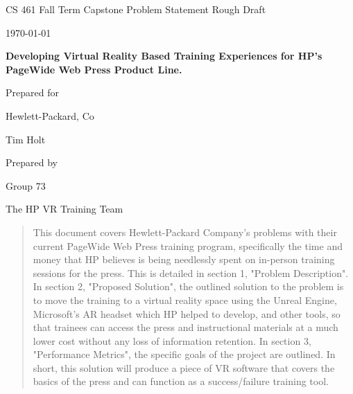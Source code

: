 \documentclass[onecolumn, draftclsnofoot,10pt, compsoc]{IEEEtran}
\def \CapstoneTeamName{		The HP VR Training Team }
\def \CapstoneTeamNumber{		73}
\def \GroupMemberOne{			Stewart Rodger}
\def \CapstoneProjectName{		Developing Virtual Reality Based Training Experiences for HP's PageWide Web Press Product Line. }
\def \CapstoneSponsorCompany{	Hewlett-Packard, Co}
\def \CapstoneSponsorPerson{		Tim Holt}
\def \DocType{		Problem Statement
				}
\newcommand{\NameSigPair}[1]{\par
\makebox[2.75in][r]{#1} \hfil 	\makebox[3.25in]{\makebox[2.25in]{\hrulefill} \hfill		\makebox[.75in]{\hrulefill}}
\par\vspace{-12pt} \textit{\tiny\noindent
\makebox[2.75in]{} \hfil		\makebox[3.25in]{\makebox[2.25in][r]{Signature} \hfill	\makebox[.75in][r]{Date}}}}
\renewcommand{\NameSigPair}[1]{#1}
\begin{document}
\begin{titlepage}
    \begin{singlespace}
        \hfill 
        \par\vspace{.2in}
        \centering
        \scshape{
            \huge CS 461 Fall Term Capstone \DocType Rough Draft \par
            {\large\today}\par
            \vspace{.5in}
            \textbf{\Huge\CapstoneProjectName}\par
            \vfill
            {\large Prepared for}\par
            \Huge \CapstoneSponsorCompany\par
            \vspace{5pt}
            {\Large\NameSigPair{\CapstoneSponsorPerson}\par}
            {\large Prepared by }\par
            Group\CapstoneTeamNumber\par
            \CapstoneTeamName\par 
            \vspace{5pt}
            {\Large
            }
            \vspace{20pt}
        }
        \begin{abstract}
        	This document covers Hewlett-Packard Company's problems with their current PageWide Web Press training program, specifically the time and money that HP believes is being needlessly spent on in-person training sessions for the press. This is detailed in section 1, "Problem Description". In section 2, "Proposed Solution", the outlined solution to the problem is to move the training to a virtual reality space using the Unreal Engine, Microsoft's AR headset which HP helped to develop, and other tools, so that trainees can access the press and instructional materials at a much lower cost without any loss of information retention. In section 3, "Performance Metrics", the specific goals of the project are outlined. In short, this solution will produce a piece of VR software that covers the basics of the press and can function as a success/failure training tool. 
        \end{abstract}     
    \end{singlespace}
\end{titlepage}
\end{document}
